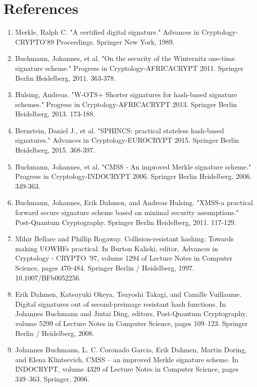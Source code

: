 \documentclass[]{scrartcl}
\begin{document}
\section*{References}
\begin{enumerate}
	\item Merkle, Ralph C. "A certified digital signature." Advances in Cryptology-CRYPTO'89 Proceedings. Springer New York, 1989.
	\item Buchmann, Johannes, et al. "On the security of the Winternitz one-time signature scheme." Progress in Cryptology-AFRICACRYPT 2011. Springer Berlin Heidelberg, 2011. 363-378.
	\item Hulsing, Andreas. "W-OTS+ Shorter signatures for hash-based signature schemes." Progress in Cryptology-AFRICACRYPT 2013. Springer Berlin Heidelberg, 2013. 173-188.
	\item Bernstein, Daniel J., et al. "SPHINCS: practical stateless hash-based signatures." Advances in Cryptology-EUROCRYPT 2015. Springer Berlin Heidelberg, 2015. 368-397.
	\item Buchmann, Johannes, et al. "CMSS - An improved Merkle signature scheme." Progress in Cryptology-INDOCRYPT 2006. Springer Berlin Heidelberg, 2006. 349-363.
	\item Buchmann, Johannes, Erik Dahmen, and Andreas Hulsing. "XMSS-a practical forward secure signature scheme based on minimal security assumptions." Post-Quantum Cryptography. Springer Berlin Heidelberg, 2011. 117-129.
	\item Mihir Bellare and Phillip Rogaway. Collision-resistant hashing: Towards making UOWHFs practical. In Burton Kaliski, editor, Advances in Cryptology - CRYPTO '97, volume 1294 of Lecture Notes in Computer Science, pages 470-484. Springer Berlin / Heidelberg, 1997. 10.1007/BFb0052256.
	\item Erik Dahmen, Katsuyuki Okeya, Tsuyoshi Takagi, and Camille Vuillaume. Digital signatures out of second-preimage resistant hash functions. In Johannes Buchmann and Jintai Ding, editors, Post-Quantum Cryptography, volume 5299 of Lecture Notes in Computer Science, pages 109--123. Springer Berlin / Heidelberg, 2008.
	\item Johannes Buchmann, L. C. Coronado Garcia, Erik Dahmen, Martin Doring, and Elena Klintsevich. CMSS -- an improved Merkle signature scheme. In INDOCRYPT, volume 4329 of Lecture Notes in Computer Science, pages 349--363. Springer, 2006.
\end{enumerate}
\end{document}
